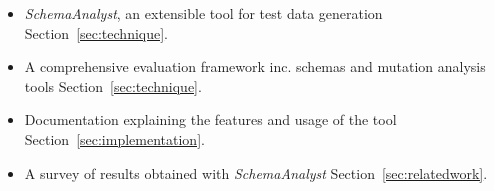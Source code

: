 \begin{itemize}
\item \textit{SchemaAnalyst}, an extensible tool for test data generation Section~\ref{sec:technique}.
\item A comprehensive evaluation framework inc. schemas and mutation analysis tools Section~\ref{sec:technique}.
\item Documentation explaining the features and usage of the tool Section~\ref{sec:implementation}.
\item A survey of results obtained with \textit{SchemaAnalyst} Section~\ref{sec:relatedwork}.
\end{itemize}
